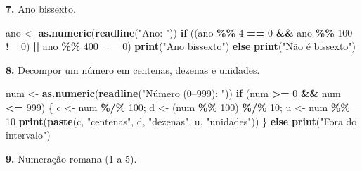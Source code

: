 \documentclass[
  portuguese,
  11pt,
  openany]{book}
\newenvironment{Shaded}{\begin{snugshade}}{\end{snugshade}}
\newcommand{\ControlFlowTok}[1]{\textcolor[rgb]{0.13,0.29,0.53}{\textbf{#1}}}
\newcommand{\DecValTok}[1]{\textcolor[rgb]{0.00,0.00,0.81}{#1}}
\newcommand{\FunctionTok}[1]{\textcolor[rgb]{0.13,0.29,0.53}{\textbf{#1}}}
\newcommand{\NormalTok}[1]{#1}
\newcommand{\OtherTok}[1]{\textcolor[rgb]{0.56,0.35,0.01}{#1}}
\newcommand{\SpecialCharTok}[1]{\textcolor[rgb]{0.81,0.36,0.00}{\textbf{#1}}}
\newcommand{\StringTok}[1]{\textcolor[rgb]{0.31,0.60,0.02}{#1}}
\begin{document}
\textbf{7.} Ano bissexto.

\begin{Shaded}
\begin{Highlighting}[]
\NormalTok{ano }\OtherTok{\textless{}{-}} \FunctionTok{as.numeric}\NormalTok{(}\FunctionTok{readline}\NormalTok{(}\StringTok{"Ano: "}\NormalTok{))}
\ControlFlowTok{if}\NormalTok{ ((ano }\SpecialCharTok{\%\%} \DecValTok{4} \SpecialCharTok{==} \DecValTok{0} \SpecialCharTok{\&\&}\NormalTok{ ano }\SpecialCharTok{\%\%} \DecValTok{100} \SpecialCharTok{!=} \DecValTok{0}\NormalTok{) }\SpecialCharTok{||}\NormalTok{ ano }\SpecialCharTok{\%\%} \DecValTok{400} \SpecialCharTok{==} \DecValTok{0}\NormalTok{)}
  \FunctionTok{print}\NormalTok{(}\StringTok{"Ano bissexto"}\NormalTok{) }\ControlFlowTok{else} \FunctionTok{print}\NormalTok{(}\StringTok{"Não é bissexto"}\NormalTok{)}
\end{Highlighting}
\end{Shaded}

\textbf{8.} Decompor um número em centenas, dezenas e unidades.

\begin{Shaded}
\begin{Highlighting}[]
\NormalTok{num }\OtherTok{\textless{}{-}} \FunctionTok{as.numeric}\NormalTok{(}\FunctionTok{readline}\NormalTok{(}\StringTok{"Número (0–999): "}\NormalTok{))}
\ControlFlowTok{if}\NormalTok{ (num }\SpecialCharTok{\textgreater{}=} \DecValTok{0} \SpecialCharTok{\&\&}\NormalTok{ num }\SpecialCharTok{\textless{}=} \DecValTok{999}\NormalTok{) \{}
\NormalTok{  c }\OtherTok{\textless{}{-}}\NormalTok{ num }\SpecialCharTok{\%/\%} \DecValTok{100}\NormalTok{; d }\OtherTok{\textless{}{-}}\NormalTok{ (num }\SpecialCharTok{\%\%} \DecValTok{100}\NormalTok{) }\SpecialCharTok{\%/\%} \DecValTok{10}\NormalTok{; u }\OtherTok{\textless{}{-}}\NormalTok{ num }\SpecialCharTok{\%\%} \DecValTok{10}
  \FunctionTok{print}\NormalTok{(}\FunctionTok{paste}\NormalTok{(c, }\StringTok{"centenas"}\NormalTok{, d, }\StringTok{"dezenas"}\NormalTok{, u, }\StringTok{"unidades"}\NormalTok{))}
\NormalTok{\} }\ControlFlowTok{else} \FunctionTok{print}\NormalTok{(}\StringTok{"Fora do intervalo"}\NormalTok{)}
\end{Highlighting}
\end{Shaded}

\textbf{9.} Numeração romana (1 a 5).
\end{document}
